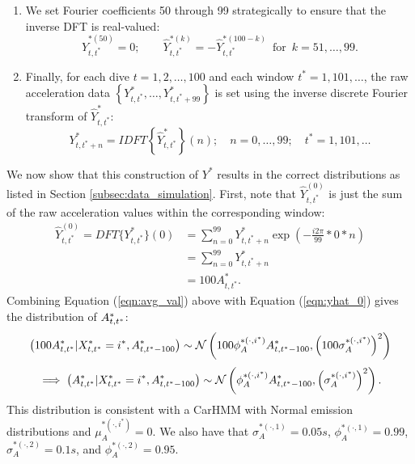 \begin{enumerate}
    \item We set Fourier coefficients 50 through 99 strategically to ensure that the inverse DFT is real-valued:
    $$
    \hat{Y}^{*(50)}_{t,t^*} = 0; \qquad
	\hat{Y}^{*(k)}_{t,t^*} = -\hat{Y}^{*(100-k)}_{t,t^*} \enspace \text{for} \enspace k = 51,\ldots,99.
    $$
    \item Finally, for each dive $t = 1,2,\ldots,100$ and each window $t^*=1,101,\ldots$, the raw acceleration data $\left\{Y^*_{t,t^*},\ldots,Y^*_{t,t^*+99}\right\}$ is set using the inverse discrete Fourier transform of $\hat{Y}^*_{t,t^*}$:
    $$Y^*_{t,t^*+n} = IDFT\left\{\hat{Y}^*_{t,t^*}\right\}(n); \quad n = 0,\ldots,99; \quad t^* = 1,101,\ldots$$
\end{enumerate}

We now show that this construction of $Y^*$ results in the correct distributions as listed in Section \ref{subsec:data_simulation}. First, note that $\hat{Y}^{(0)}_{t,t^*}$ is just the sum of the raw acceleration values within the corresponding window:
%
\begin{align}
    \hat{Y}^{(0)}_{t,t^*} = DFT\{Y^*_{t,t^*}\}(0) &= \sum_{n=0}^{99} Y^*_{t,t^*+n} \exp\left(-\frac{i2\pi}{99}*0*n\right) \nonumber \\
    &= \sum_{n=0}^{99} Y^*_{t,t^*+n} \nonumber \\
    &= 100A^*_{t,t^*}.
    \label{eqn:avg_val}
\end{align}
%
Combining Equation (\ref{eqn:avg_val}) above with Equation (\ref{eqn:yhat_0}) gives the distribution of $A^*_{t,t^*}$: 
%
$$\left(100A^*_{t,t^*} | X^*_{t,t^*} = i^*, A^*_{t,t^*-100} \right) \sim \mathcal{N} \left(100\phi_A^{*(\cdot,i^*)} A^*_{t,t^*-100}, \left(100\sigma_A^{*(\cdot,i^*)}\right)^2 \right)$$
%
$$\implies \left(A^*_{t,t^*} | X^*_{t,t^*} = i^*, A^*_{t,t^*-100} \right) \sim \mathcal{N} \left(\phi_A^{*(\cdot,i^*)} A^*_{t,t^*-100}, \left(\sigma_A^{*(\cdot,i^*)}\right)^2 \right).$$
%
This distribution is consistent with a CarHMM with Normal emission distributions and $\mu_A^{*(\cdot,i^*)} = 0$. We also have that $\sigma_A^{*(\cdot,1)} = 0.05s$, $\phi_A^{*(\cdot,1)} = 0.99$, $\sigma_A^{*(\cdot,2)} = 0.1s$, and $\phi_A^{*(\cdot,2)} = 0.95$.


